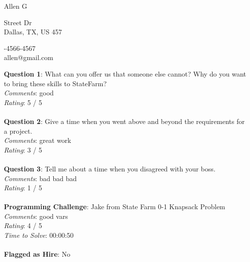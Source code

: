 \documentclass[12pt]{article}
\begin{document}
{\LARGE \begin{center}Allen G\end{center}}

\begin{multicols}{2}
 Street Dr \\
Dallas, TX, US 457
\columnbreak

-4566-4567 \\
allen@gmail.com
\end{multicols}

\noindent
\textbf{Question 1}: What can you offer us that someone else cannot? Why do you want to bring these skills to StateFarm?
\\\noindent
\textit{Comments}: good
\\\noindent
\textit{Rating}: 5 / 5
\\\\
\noindent
\textbf{Question 2}: Give a time when you went above and beyond the requirements for a project.
\\\noindent
\textit{Comments}: great work
\\\noindent
\textit{Rating}: 3 / 5
\\\\
\noindent
\textbf{Question 3}: Tell me about a time when you disagreed with your boss.
\\\noindent
\textit{Comments}: bad bad bad
\\\noindent
\textit{Rating}: 1 / 5
\\\\
\noindent
\textbf{Programming Challenge}: Jake from State Farm 0-1 Knapsack Problem
\\\noindent
\textit{Comments}: good vars
\\\noindent
\textit{Rating}: 4 / 5
\\\noindent
\textit{Time to Solve}: 00:00:50
\\\\
\textbf{Flagged as Hire}: No
\\\\ 
\end{document}
